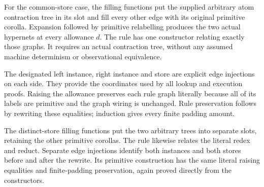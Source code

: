 For the common-store case, the filling functions put the supplied arbitrary
atom contraction tree in its slot and fill every other edge with its
original primitive corolla. Expansion followed by primitive relabelling
produces the two actual hypernets at every allowance $d$. The rule has one
constructor relating exactly those graphs. It requires an actual contraction
tree, without any assumed machine determinism or observational equivalence.






The designated left instance, right instance and store are explicit edge
injections on each side. They provide the coordinates used by all lookup
and execution proofs. Raising the allowance preserves each rule graph
literally because all of its labels are primitive and the graph wiring is
unchanged. Rule preservation follows by rewriting these equalities; induction
gives every finite padding amount.











The distinct-store filling functions put the two arbitrary trees into
separate slots, retaining the other primitive corollas. The rule likewise
relates the literal redex and reduct. Separate edge injections identify
both instances and both stores before and after the rewrite. Its primitive
construction has the same literal raising equalities and finite-padding
preservation, again proved directly from the constructors.

